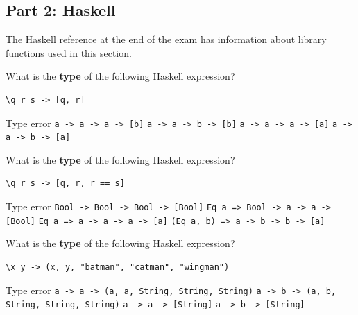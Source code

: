 \documentclass[addpoints]{exam}
\begin{document}
\begin{questions}

\newpage

\subsection*{\textbf{Part 2: Haskell}}

\noindent The Haskell reference at the end of the exam has information about library functions used in this section.

\question[3] What is the \textbf{type} of the following Haskell expression?

\begin{verbatim}
\q r s -> [q, r] 
\end{verbatim}

\begin{checkboxes}
  \choice Type error
  \choice \texttt{a -> a -> a -> [b]}
  \choice \texttt{a -> a -> b -> [b]}
  \choice \texttt{a -> a -> a -> [a]}
  \CorrectChoice \texttt{a -> a -> b -> [a]}
\end{checkboxes}

\question[3] What is the \textbf{type} of the following Haskell expression?
\begin{verbatim}
\q r s -> [q, r, r == s]
\end{verbatim}
\begin{checkboxes}
  \choice Type error
  \CorrectChoice \texttt{Bool -> Bool -> Bool -> [Bool]}
  \choice \texttt{Eq a => Bool -> a -> a -> [Bool]}
  \choice \texttt{Eq a => a -> a -> a -> [a]}
  \choice \texttt{(Eq a, b) => a -> b -> b -> [a]}
\end{checkboxes}

\question[3] What is the \textbf{type} of the following Haskell expression?
\begin{verbatim}
\x y -> (x, y, "batman", "catman", "wingman")
\end{verbatim}
\begin{checkboxes}
  \choice Type error
  \choice \texttt{a -> a -> (a, a, String, String, String)}
  \CorrectChoice \texttt{a -> b -> (a, b, String, String, String)}
  \choice \texttt{a -> a -> [String]}
  \choice \texttt{a -> b -> [String]}
\end{checkboxes}


\end{questions}
\end{document}
